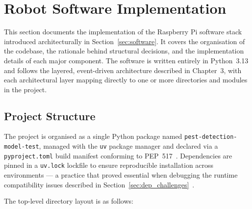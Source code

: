 %
%

 
\section{Robot Software Implementation}
\label{sec:robot_software}
 
This section documents the implementation of the Raspberry Pi software
stack introduced architecturally in Section~\ref{sec:software}. It
covers the organisation of the codebase, the rationale behind
structural decisions, and the implementation details of each major
component. The software is written entirely in Python~3.13 and follows
the layered, event-driven architecture described in
Chapter~3, with each architectural layer mapping directly to one or
more directories and modules in the project.
 
\subsection{Project Structure}
\label{sec:project_structure}
 
The project is organised as a single Python package named
\texttt{pest-detection-model-test}, managed with the \texttt{uv}
package manager and declared via a \texttt{pyproject.toml} build
manifest conforming to PEP~517~\cite{pep517}. Dependencies are pinned
in a \texttt{uv.lock} lockfile to ensure reproducible installation
across environments — a practice that proved essential when debugging
the runtime compatibility issues described in
Section~\ref{sec:dep_challenges}~\cite{pip2024}.
 
The top-level directory layout is as follows:
 
